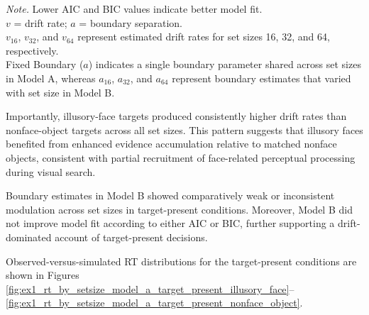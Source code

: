 \documentclass[stu,12pt,floatsintext]{apa7}
\begin{document}
\begin{table}[H]
\vspace{0.8em}


\vspace{0.4em}
{\footnotesize\textit{Note.} Lower AIC and BIC values indicate better model fit.\\
$v$ = drift rate; $a$ = boundary separation.\\
$v_{16}$, $v_{32}$, and $v_{64}$ represent estimated drift rates for set sizes 16, 32, and 64, respectively.\\
Fixed Boundary ($a$) indicates a single boundary parameter shared across set sizes in Model A, whereas $a_{16}$, $a_{32}$, and $a_{64}$ represent boundary estimates that varied with set size in Model B.}
\end{table}

Importantly, illusory-face targets produced consistently higher drift rates than nonface-object targets across all set sizes. This pattern suggests that illusory faces benefited from enhanced evidence accumulation relative to matched nonface objects, consistent with partial recruitment of face-related perceptual processing during visual search.

Boundary estimates in Model B showed comparatively weak or inconsistent modulation across set sizes in target-present conditions. Moreover, Model B did not improve model fit according to either AIC or BIC, further supporting a drift-dominated account of target-present decisions.

Observed-versus-simulated RT distributions for the target-present conditions are shown in Figures \ref{fig:ex1_rt_by_setsize_model_a_target_present_illusory_face}--\ref{fig:ex1_rt_by_setsize_model_a_target_present_nonface_object}.
\end{document}
